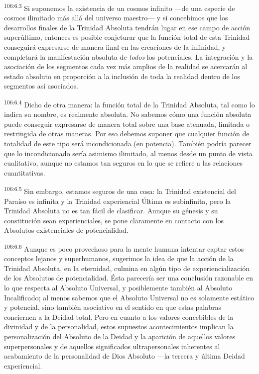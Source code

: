 \par
\textsuperscript{106:6.3} Si suponemos la existencia de un cosmos infinito ---de una especie de cosmos ilimitado más allá del universo maestro--- y si concebimos que los desarrollos finales de la Trinidad Absoluta tendrán lugar en ese campo de acción superúltimo, entonces es posible conjeturar que la función total de esta Trinidad conseguirá expresarse de manera final en las creaciones de la infinidad, y completará la manifestación absoluta de \textit{todos} los potenciales. La integración y la asociación de los segmentos cada vez más amplios de la realidad se acercarán al estado absoluto en proporción a la inclusión de toda la realidad dentro de los segmentos así asociados.

\par
\textsuperscript{106:6.4} Dicho de otra manera: la función total de la Trinidad Absoluta, tal como lo indica su nombre, es realmente absoluta. No sabemos cómo una función absoluta puede conseguir expresarse de manera total sobre una base atenuada, limitada o restringida de otras maneras. Por eso debemos suponer que cualquier función de totalidad de este tipo será incondicionada (en potencia). También podría parecer que lo incondicionado sería asimismo ilimitado, al menos desde un punto de vista cualitativo, aunque no estamos tan seguros en lo que se refiere a las relaciones cuantitativas.

\par
\textsuperscript{106:6.5} Sin embargo, estamos seguros de una cosa: la Trinidad existencial del Paraíso es infinita y la Trinidad experiencial Última es subinfinita, pero la Trinidad Absoluta no es tan fácil de clasificar. Aunque su génesis y su constitución sean experienciales, se pone claramente en contacto con los Absolutos existenciales de potencialidad.

\par
\textsuperscript{106:6.6} Aunque es poco provechoso para la mente humana intentar captar estos conceptos lejanos y superhumanos, sugerimos la idea de que la acción de la Trinidad Absoluta, en la eternidad, culmina en algún tipo de experiencialización de los Absolutos de potencialidad. Ésta parecería ser una conclusión razonable en lo que respecta al Absoluto Universal, y posiblemente también al Absoluto Incalificado; al menos sabemos que el Absoluto Universal no es solamente estático y potencial, sino también asociativo en el sentido en que estas palabras conciernen a la Deidad total. Pero en cuanto a los valores concebibles de la divinidad y de la personalidad, estos supuestos acontecimientos implican la personalización del Absoluto de la Deidad y la aparición de aquellos valores superpersonales y de aquellos significados ultrapersonales inherentes al acabamiento de la personalidad de Dios Absoluto ---la tercera y última Deidad experiencial.

